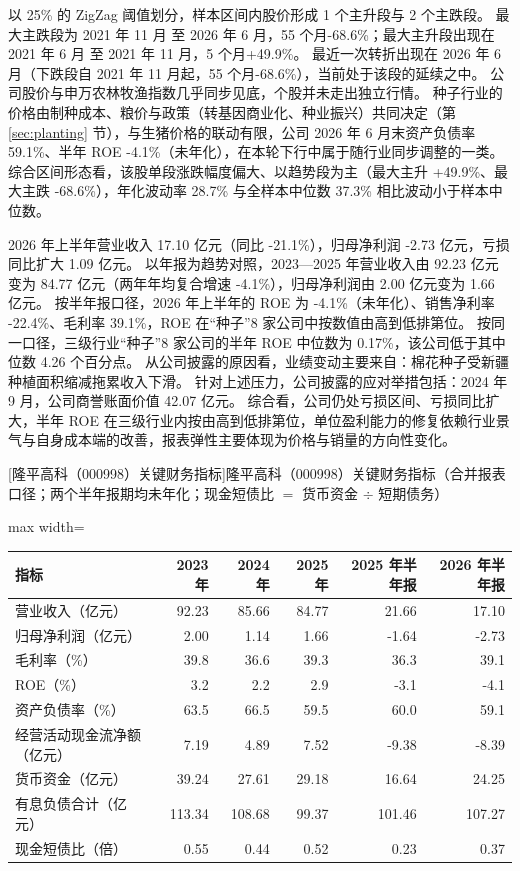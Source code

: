  以 25\% 的 ZigZag 阈值划分，样本区间内股价形成 1 个主升段与 2 个主跌段。 最大主跌段为 2021 年 11 月 至 2026 年 6 月，55 个月-68.6\%；最大主升段出现在 2021 年 6 月 至 2021 年 11 月，5 个月+49.9\%。 最近一次转折出现在 2026 年 6 月（下跌段自 2021 年 11 月起，55 个月-68.6\%），当前处于该段的延续之中。 公司股价与申万农林牧渔指数几乎同步见底，个股并未走出独立行情。 种子行业的价格由制种成本、粮价与政策（转基因商业化、种业振兴）共同决定（第 \ref{sec:planting} 节），与生猪价格的联动有限，公司 2026 年 6 月末资产负债率 59.1\%、半年 ROE -4.1\%（未年化），在本轮下行中属于随行业同步调整的一类。 综合区间形态看，该股单段涨跌幅度偏大、以趋势段为主（最大主升 +49.9\%、最大主跌 -68.6\%），年化波动率 28.7\% 与全样本中位数 37.3\% 相比波动小于样本中位数。

 2026 年上半年营业收入 17.10 亿元（同比 -21.1\%），归母净利润 -2.73 亿元，亏损同比扩大 1.09 亿元。 以年报为趋势对照，2023---2025 年营业收入由 92.23 亿元变为 84.77 亿元（两年年均复合增速 -4.1\%），归母净利润由 2.00 亿元变为 1.66 亿元。 按半年报口径，2026 年上半年的 ROE 为 -4.1\%（未年化）、销售净利率 -22.4\%、毛利率 39.1\%，ROE 在“种子”8 家公司中按数值由高到低排第位。 按同一口径，三级行业“种子”8 家公司的半年 ROE 中位数为 0.17\%，该公司低于其中位数 4.26 个百分点。 从公司披露的原因看，业绩变动主要来自：棉花种子受新疆种植面积缩减拖累收入下滑。 针对上述压力，公司披露的应对举措包括：2024 年 9 月，公司商誉账面价值 42.07 亿元。 综合看，公司仍处亏损区间、亏损同比扩大，半年 ROE 在三级行业内按由高到低排第位，单位盈利能力的修复依赖行业景气与自身成本端的改善，报表弹性主要体现为价格与销量的方向性变化。

\begin{center}\small\setlength{\tabcolsep}{3.4pt}
[隆平高科（000998）关键财务指标]{隆平高科（000998）关键财务指标（合并报表口径；两个半年报期均未年化；现金短债比 $=$ 货币资金 $\div$ 短期债务）}
\begin{adjustbox}{max width=\textwidth}
\begin{tabular}{@{}lrrrrr@{}}
\toprule
指标 & 2023 年 & 2024 年 & 2025 年 & 2025 年半年报 & 2026 年半年报 \\
\midrule
营业收入（亿元） & 92.23 & 85.66 & 84.77 & 21.66 & 17.10 \\
归母净利润（亿元） & 2.00 & 1.14 & 1.66 & -1.64 & -2.73 \\
毛利率（\%） & 39.8 & 36.6 & 39.3 & 36.3 & 39.1 \\
ROE（\%） & 3.2 & 2.2 & 2.9 & -3.1 & -4.1 \\
资产负债率（\%） & 63.5 & 66.5 & 59.5 & 60.0 & 59.1 \\
经营活动现金流净额（亿元） & 7.19 & 4.89 & 7.52 & -9.38 & -8.39 \\
货币资金（亿元） & 39.24 & 27.61 & 29.18 & 16.64 & 24.25 \\
有息负债合计（亿元） & 113.34 & 108.68 & 99.37 & 101.46 & 107.27 \\
现金短债比（倍） & 0.55 & 0.44 & 0.52 & 0.23 & 0.37 \\
\bottomrule
\end{tabular}
\end{adjustbox}
\end{center}

